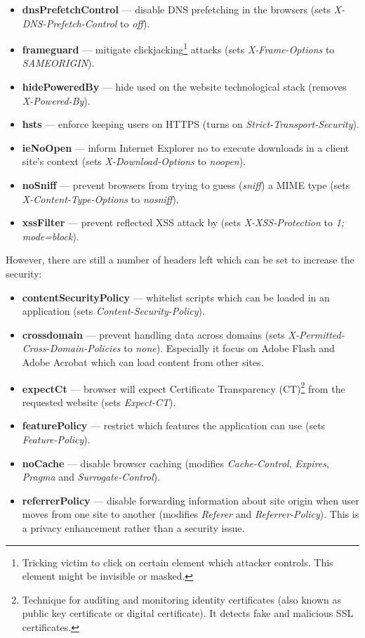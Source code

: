 \documentclass{article} %
\begin{document}
\begin{itemize}
    \item \textbf{dnsPrefetchControl} --- disable DNS prefetching in the browsers (sets \textit{X-DNS-Prefetch-Control} to \textit{off}).
    \item \textbf{frameguard} --- mitigate clickjacking\footnote{Tricking victim to click on certain element which attacker controls. This element might be invisible or masked.} attacks (sets \textit{X-Frame-Options} to \textit{SAMEORIGIN}).
    \item \textbf{hidePoweredBy} --- hide used on the website technological stack (removes \textit{X-Powered-By}).
    \item \textbf{hsts} --- enforce keeping users on HTTPS (turns on \textit{Strict-Transport-Security}).
    \item \textbf{ieNoOpen} --- inform Internet Explorer no to execute downloads in a client site's context (sets \textit{X-Download-Options} to \textit{noopen}).
    \item \textbf{noSniff} ---  prevent browsers from trying to guess (\textit{sniff}) a MIME type (sets \textit{X-Content-Type-Options} to \textit{nosniff}).
    \item \textbf{xssFilter} --- prevent reflected XSS attack by (sets \textit{X-XSS-Protection} to \textit{1; mode=block}).
\end{itemize}
However, there are still a number of headers left which can be set to increase the security:
\begin{itemize}
    \item \textbf{contentSecurityPolicy} --- whitelist scripts which can be loaded in an application (sets \textit{Content-Security-Policy}).
    \item \textbf{crossdomain} --- prevent handling data across domains (sets \textit{X-Permitted-Cross-Domain-Policies} to \textit{none}). Especially it focus on Adobe Flash and Adobe Acrobat which can load content from other sites.
    \item \textbf{expectCt} --- browser will expect Certificate Transparency (CT)\footnote{Technique for auditing and monitoring identity certificates (also known as public key certificate or digital certificate). It detects fake and malicious SSL certificates.} from the requested website (sets \textit{Expect-CT}).
    \item \textbf{featurePolicy} --- restrict which features the application can use (sets \textit{Feature-Policy}).
    \item \textbf{noCache} --- disable browser caching (modifies \textit{Cache-Control}, \textit{Expires}, \textit{Pragma} and \textit{Surrogate-Control}).
    \item \textbf{referrerPolicy} --- disable forwarding information about site origin when user moves from one site to another (modifies \textit{Referer} and \textit{Referrer-Policy}). This is a privacy enhancement rather than a security issue.
\end{itemize}
\end{document}
